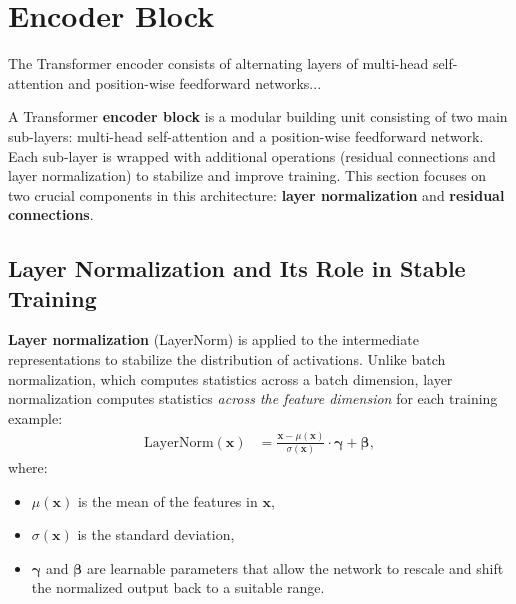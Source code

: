 \section{Encoder Block}
\label{sec:encoder_block}

\noindent
The Transformer encoder consists of alternating layers of multi-head self-attention and position-wise feedforward networks...

\noindent
A Transformer \textbf{encoder block} is a modular building unit consisting of two main sub-layers: multi-head self-attention and a position-wise feedforward network. Each sub-layer is wrapped with additional operations (residual connections and layer normalization) to stabilize and improve training. This section focuses on two crucial components in this architecture: \textbf{layer normalization} and \textbf{residual connections}.

\subsection{Layer Normalization and Its Role in Stable Training}
\noindent
\textbf{Layer normalization} (LayerNorm) is applied to the intermediate representations to stabilize the distribution of activations. Unlike batch normalization, which computes statistics across a batch dimension, layer normalization computes statistics \emph{across the feature dimension} for each training example:
\begin{equation}
\begin{aligned}
\text{LayerNorm}(\mathbf{x}) &= \frac{\mathbf{x} - \mu(\mathbf{x})}{\sigma(\mathbf{x})} \cdot \boldsymbol{\gamma} + \boldsymbol{\beta},
\end{aligned}
\end{equation}
where:
\begin{itemize}
    \item $\mu(\mathbf{x})$ is the mean of the features in $\mathbf{x}$,
    \item $\sigma(\mathbf{x})$ is the standard deviation,
    \item $\boldsymbol{\gamma}$ and $\boldsymbol{\beta}$ are learnable parameters that allow the network to rescale and shift the normalized output back to a suitable range.
\end{itemize}

